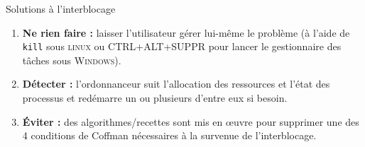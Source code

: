 \documentclass[10pt]{beamer}
\begin{document}
\begin{frame}[fragile]{Solutions à l'interblocage}
\begin{enumerate}[--]
	\item 	\textbf{Ne rien faire :} laisser l'utilisateur gérer lui-même le problème (à l'aide de \texttt{kill} sous \textsc{linux} ou CTRL+ALT+SUPPR pour lancer le gestionnaire des tâches sous \textsc{Windows}).
	\item 	\textbf{Détecter :}  l’ordonnanceur suit l’allocation des ressources et l’état des processus et redémarre un ou plusieurs d’entre eux si besoin.
    \item \textbf{\'Eviter :} des algorithmes/recettes sont mis en œuvre pour supprimer une des 4 conditions de Coffman nécessaires à la survenue de l’interblocage.
\end{enumerate}
\end{frame}
\end{document}
